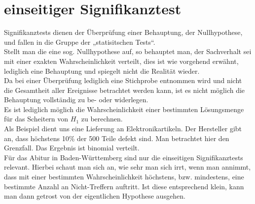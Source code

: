 \section{einseitiger Signifikanztest}
	Signifikanztests dienen der Überprüfung einer Behauptung, der Nullhypothese,
	und fallen in die Gruppe der „statisitschen Tests“.\\
	Stellt man die eine sog. Nullhypothese auf, so behauptet man, der Sachverhalt
	sei mit einer exakten Wahrscheinlichkeit verteilt, dies ist wie vorgehend
	erwähnt, lediglich eine Behauptung und spiegelt nicht die Realität wieder.\\
	Da bei einer Überprüfung lediglich eine Stichprobe entnommen wird und nicht die
	Gesamtheit aller Ereignisse betrachtet werden kann, ist es nicht möglich die
	Behauptung vollständig zu be- oder widerlegen.\\
	Es ist lediglich möglich die Wahrscheinlichkeit einer bestimmten Lösungsmenge
	für das Scheitern von \(H_1\) zu berechnen.\\
	Als Beispiel dient uns eine Lieferung an Elektronikartikeln. Der Hersteller
	gibt an, dass höchstens 10\% der 500 Teile defekt sind. Man betrachtet hier den
	Grenzfall. Das Ergebnis ist binomial verteilt.\\
	Für das Abitur in Baden-Württemberg sind nur die einseitigen Signifikanztests
	relevant.
	Hierbei schaut man sich an, wie sehr man sich irrt, wenn man annimmt, dass mit
	einer bestimmten Wahrscheinlichkeit höchstens, bzw. mindestens, eine bestimmte
	Anzahl an Nicht-Treffern auftritt. Ist diese entsprechend klein, kann man dann
	getrost von der eigentlichen Hypothese ausgehen.

	

	

	

	 